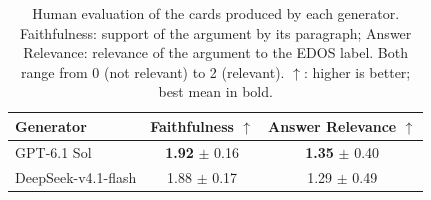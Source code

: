 \begin{table}[t]
\centering
\small
\caption{Human evaluation of the cards produced by each generator. Faithfulness: support of the argument by its paragraph; Answer Relevance: relevance of the argument to the EDOS label. Both range from 0 (not relevant) to 2 (relevant). $\uparrow$: higher is better; best mean in bold.}
\label{tab:cards-human}
\begin{tabular}{lcc}
\toprule
\textbf{Generator} & \textbf{Faithfulness} $\uparrow$ & \textbf{Answer Relevance} $\uparrow$ \\
\midrule
GPT-6.1 Sol & \textbf{1.92} $\pm$ 0.16 & \textbf{1.35} $\pm$ 0.40 \\
DeepSeek-v4.1-flash & 1.88 $\pm$ 0.17 & 1.29 $\pm$ 0.49 \\
\bottomrule
\end{tabular}
\end{table}
